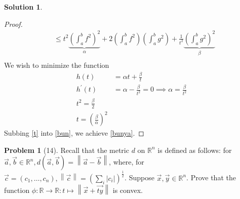 \documentclass[12pt]{article}
\theoremstyle{definition} %
\newtheorem{solution}{Solution}
\newtheorem{problem}{Problem}
\theoremstyle{plain} %
\begin{document}
\begin{solution}
\begin{enumerate}
\begin{proof}
\begin{align}
            &\leq t^{2}\underbrace{\left( \int_{a}^{b} f^{2}   \right)^{2} }_{\alpha}+2\left( \int_{a}^{b} f^{2}  \right)\left( \int_{a}^{b} g^{2}  \right) + \frac{1}{t^{2}}\underbrace{\left( \int_{a}^{b} g^{2}   \right)^{2} }_{\beta} \\[10pt]     
           \end{align} 
           We wish to minimize the function 
           \begin{align}
            h(t) &= \alpha t + \frac{\beta}{t} \\[10pt] 
            h^\prime (t) &= \alpha - \frac{\beta}{t^{2}} = 0
            \implies \alpha=\frac{\beta}{t^{2}} \\[10pt] 
            t^{2}=\frac{\beta}{2}\\[10pt] 
            t = \left( \frac{\beta}{\alpha} \right)^{2} \label{t}
           \end{align} 
           Subbing \autoref{t} into \autoref{bun}, we achieve \autoref{bunya}.
        \end{proof}
    \end{enumerate}
\end{solution}
\begin{problem}[14]
   Recall that the metric $d$ on $\mathbb{{R}}^{n}$ is defined as follows: for $\vec{a}, \vec{b}\in \mathbb{{R}}^{n}, d(\vec{a},\vec{b})=\left\lVert \vec{a} -\vec{b} \right\rVert $, where, for $\vec{c}=(c_1, \ldots , c_{n}),\left\lVert \vec{c} \right\rVert =\left( \sum_{i} \left\vert c_i \right\vert  \right)^{\frac{1}{2}}  $. Suppose $\vec{x}, \vec{y} \in \mathbb{{R}}^{n}$. Prove that the function $\phi:\mathbb{{R}}\to \mathbb{{R}}:t \mapsto \left\lVert \vec{x} +\vec{ty} \right\rVert $ is convex.     
\end{problem}
\end{document}
